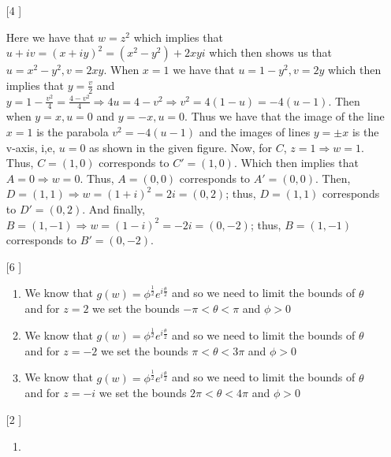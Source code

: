 \documentclass{article}
\theoremstyle{definition}
\begin{document}
\begin{enumerate}
    \item [[\phantom{-}4]]

    Here we have that $w = z^2$ which implies that $u + iv = (x + iy)^2 = (x^2 - y^2) + 2xyi$ which then shows us that $u = x^2 - y^2, v = 2xy$. When $x = 1$ we have that $u = 1 - y^2, v = 2y$ which then implies that $y = \frac{v}{2}$ and $y = 1-\frac{v^2}{4} = \frac{4 - v^2}{4} \Rightarrow 4u = 4 - v^2 \Rightarrow v^2 = 4(1 - u) = -4(u - 1).$ Then when $y = x, u = 0$ and $y = -x, u = 0$. Thus we have that the image of the line $x = 1$ is the parabola $v^2 = -4(u - 1)$ and the images of lines $y = \pm x$ is the v-axis, i,e, $u = 0$ as shown in the given figure. Now, for $C$, $z = 1 \Rightarrow w = 1$. Thus, $C = (1, 0)$ corresponds to $C' = (1, 0).$ Which then implies that $A = 0 \Rightarrow w = 0$. Thus, $A = (0, 0)$ corresponds to $A' = (0, 0).$ Then, $D = (1, 1) \Rightarrow w = (1 + i)^2 = 2i = (0, 2)$; thus, $D = (1, 1)$ corresponds to $D' = (0, 2).$ And finally, $B = (1, -1) \Rightarrow w = (1 - i)^2 = -2i = (0, -2)$; thus, $B = (1, -1)$ corresponds to $B' = (0, -2).$

    \item [[\phantom{-}6]]

    \begin{enumerate}
        \item

        We know that $g(w) = \phi^{\frac{1}{2}}e^{i\frac{\theta}{2}}$ and so we need to limit the bounds of $\theta$ and for $z = 2$ we set the bounds $-\pi < \theta < \pi$ and $\phi > 0$

        \item

        We know that $g(w) = \phi^{\frac{1}{2}}e^{i\frac{\theta}{2}}$ and so we need to limit the bounds of $\theta$ and for $z = -2$ we set the bounds $\pi < \theta < 3\pi$ and $\phi > 0$

        \item

        We know that $g(w) = \phi^{\frac{1}{2}}e^{i\frac{\theta}{2}}$ and so we need to limit the bounds of $\theta$ and for $z = -i$ we set the bounds $2\pi < \theta < 4\pi$ and $\phi > 0$
    
    \end{enumerate}

    \item [[\phantom{-}2]]

    \begin{enumerate}
        \item


\end{enumerate}
\end{enumerate}
\end{document}
